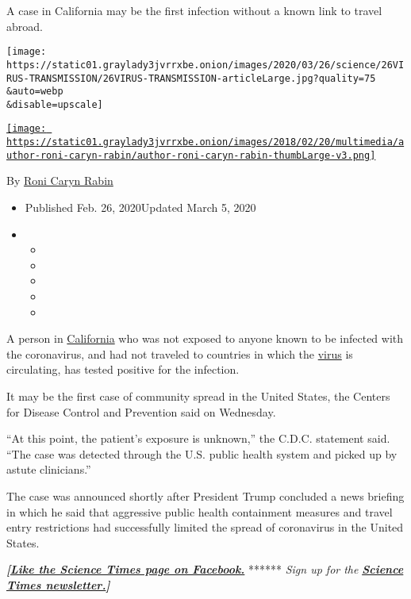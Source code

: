 A case in California may be the first infection without a known link to
travel abroad.

\texttt{[image: https://static01.graylady3jvrrxbe.onion/images/2020/03/26/science/26VIRUS-TRANSMISSION/26VIRUS-TRANSMISSION-articleLarge.jpg?quality=75\\\&auto=webp\\\&disable=upscale]}

\href{https://www.nytimes3xbfgragh.onion/by/roni-caryn-rabin}{\texttt{[image: https://static01.graylady3jvrrxbe.onion/images/2018/02/20/multimedia/author-roni-caryn-rabin/author-roni-caryn-rabin-thumbLarge-v3.png]}}

By \href{https://www.nytimes3xbfgragh.onion/by/roni-caryn-rabin}{Roni
Caryn Rabin}

\begin{itemize}
\item
  Published Feb. 26, 2020Updated March 5, 2020
\item
  \begin{itemize}
  \item
  \item
  \item
  \item
  \item
  \end{itemize}
\end{itemize}

A person in
\href{https://www.nytimes3xbfgragh.onion/2020/03/06/us/california-coronavirus-cruise-ship.html}{California}
who was not exposed to anyone known to be infected with the coronavirus,
and had not traveled to countries in which the
\href{https://www.nytimes3xbfgragh.onion/2020/03/06/us/california-coronavirus-cruise-ship.html}{virus}
is circulating, has tested positive for the infection.

It may be the first case of community spread in the United States, the
Centers for Disease Control and Prevention said on Wednesday.

``At this point, the patient's exposure is unknown,'' the C.D.C.
statement said. ``The case was detected through the U.S. public health
system and picked up by astute clinicians.''

The case was announced shortly after President Trump concluded a news
briefing in which he said that aggressive public health containment
measures and travel entry restrictions had successfully limited the
spread of coronavirus in the United States.

\textbf{\emph{{[}}\href{http://on.fb.me/1paTQ1h}{\emph{Like the Science
Times page on Facebook.}}} ****** \emph{\textbar{} Sign up for the}
\textbf{\href{http://nyti.ms/1MbHaRU}{\emph{Science Times
newsletter.}}\emph{{]}}}

